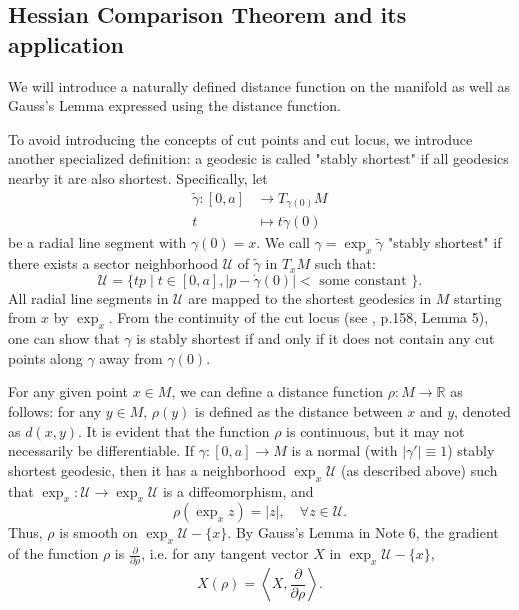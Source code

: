\documentclass{ctexart}
\begin{document}
\subsection*{Hessian Comparison Theorem and its application}
We will introduce a naturally defined distance function on the manifold as well as Gauss's Lemma expressed using the distance function.

To avoid introducing the concepts of cut points and cut locus, we introduce another specialized definition: a geodesic is called "stably shortest" if all geodesics nearby it are also shortest. Specifically, let
$$
\begin{aligned}
  \widetilde{\gamma}:[0, a] &\rightarrow T_{\gamma(0)} M \\
  t &\mapsto t \dot{\gamma}(0)
\end{aligned}
$$
be a radial line segment with $\gamma(0)=x$. We call $\gamma=\exp _x \widetilde{\gamma}$ "stably shortest" if there exists a sector neighborhood $\mathcal{U}$ of $\widetilde{\gamma}$ in $T_x M$ such that:
$$
\mathcal{U}=\{t p\mid t \in[0, a],|p-\dot{\gamma}(0)|<\text { some constant }\}.
$$
All radial line segments in $\mathcal{U}$ are mapped to the shortest geodesics in $M$ starting from $x$ by $\exp _x$. 
From the continuity of the cut locus (see \cite{WuHongXi2014}, p.158, Lemma 5), one can show that 
$\gamma$ is stably shortest if and only if it does not contain any cut points along $\gamma$ away from $\gamma(0)$.

For any given point $x \in M$, we can define a distance function $\rho: M \rightarrow \mathbb{R}$ as follows: 
for any $y \in M$, $\rho(y)$ is defined as the distance between $x$ and $y$, denoted as $d(x, y)$. It is evident that the function $\rho$ is continuous, but it may not necessarily be differentiable.
If $\gamma:[0, a] \rightarrow M$ is a normal (with $|\gamma'|\equiv 1$) stably shortest geodesic, then it has a neighborhood $\exp _x \mathcal{U}$ (as described above) such that 
$\exp _x: \mathcal{U} \rightarrow \exp _x \mathcal{U}$ is a diffeomorphism, and
$$
\rho\left(\exp _x z\right)=|z|, \quad \forall z \in \mathcal{U} .
$$
Thus, $\rho$ is smooth on $\exp _x \mathcal{U}-\{x\}$. 
By Gauss's Lemma in Note 6, the gradient of the function $\rho$ is $\frac{\partial}{\partial \rho}$, i.e. for any tangent vector $X$ in $\exp _x \mathcal{U}-\{x\}$, 
$$
X (\rho)=\left\langle X, \frac{\partial}{\partial \rho}\right\rangle.
$$  
\end{document}
